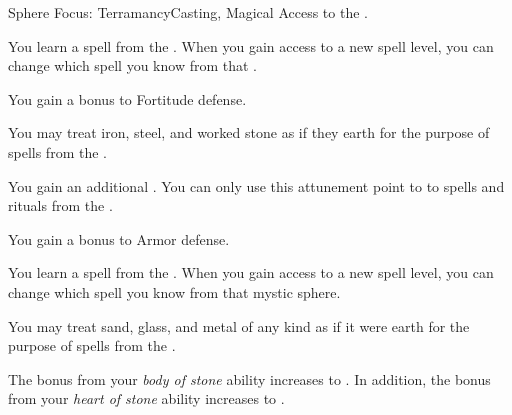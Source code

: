     \begin{feat}{Sphere Focus: Terramancy}{Casting, Magical}
        \featpre Access to the  .

         You learn a spell from the  .
        When you gain access to a new spell level, you can change which spell you know from that .

         You gain a  bonus to Fortitude defense.

         You may treat iron, steel, and worked stone as if they earth for the purpose of spells from the  .

         You gain an additional .
        You can only use this attunement point to  to spells and rituals from the  .

         You gain a  bonus to Armor defense.

         You learn a spell from the  .
        When you gain access to a new spell level, you can change which spell you know from that mystic sphere.

         You may treat sand, glass, and metal of any kind as if it were earth for the purpose of spells from the  .

         The bonus from your \textit{body of stone} ability increases to .
        In addition, the bonus from your \textit{heart of stone} ability increases to .
    \end{feat}

